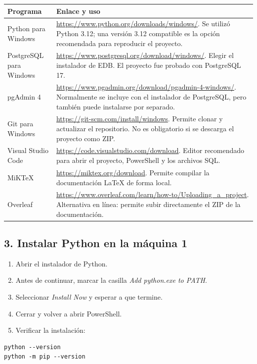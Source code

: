 \documentclass[12pt,letterpaper]{article}
\begin{document}
\begin{longtable}{p{}p{}}
\toprule
\textbf{Programa} & \textbf{Enlace y uso} \\
\midrule
Python para Windows &
\url{https://www.python.org/downloads/windows/}. Se utilizó Python 3.12; una
versión 3.12 compatible es la opción recomendada para reproducir el proyecto. \\
PostgreSQL para Windows &
\url{https://www.postgresql.org/download/windows/}. Elegir el instalador de
EDB. El proyecto fue probado con PostgreSQL 17. \\
pgAdmin 4 &
\url{https://www.pgadmin.org/download/pgadmin-4-windows/}. Normalmente se
incluye con el instalador de PostgreSQL, pero también puede instalarse por
separado. \\
Git para Windows &
\url{https://git-scm.com/install/windows}. Permite clonar y actualizar el
repositorio. No es obligatorio si se descarga el proyecto como ZIP. \\
Visual Studio Code &
\url{https://code.visualstudio.com/download}. Editor recomendado para abrir
el proyecto, PowerShell y los archivos SQL. \\
MiKTeX &
\url{https://miktex.org/download}. Permite compilar la documentación LaTeX de
forma local. \\
Overleaf &
\url{https://www.overleaf.com/learn/how-to/Uploading_a_project}. Alternativa
en línea: permite subir directamente el ZIP de la documentación. \\
\bottomrule
\end{longtable}

\subsection{3. Instalar Python en la máquina 1}

\begin{enumerate}
  \item Abrir el instalador de Python.
  \item Antes de continuar, marcar la casilla \textit{Add python.exe to PATH}.
  \item Seleccionar \textit{Install Now} y esperar a que termine.
  \item Cerrar y volver a abrir PowerShell.
  \item Verificar la instalación:
\end{enumerate}

\begin{lstlisting}
python --version
python -m pip --version
\end{lstlisting}
\end{document}
